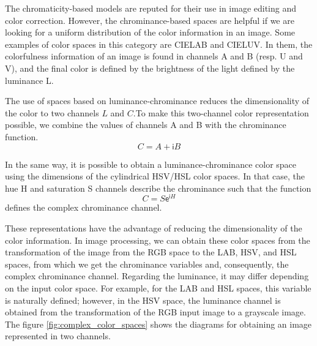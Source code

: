 The chromaticity-based models are reputed for their use in image editing and color correction. However, the chrominance-based spaces are helpful if we are looking for a uniform distribution of the color information in an image. Some examples of color spaces in this category are CIELAB and CIELUV. In them, the colorfulness information of an image is found in channels A and B (resp. U and V), and the final color is defined by the brightness of the light defined by the luminance L.

The use of spaces based on luminance-chrominance reduces the dimensionality of the color to two channels $L$ and $C$.To make this two-channel color representation possible, we combine the values of channels A and B with the chrominance function.
\begin{equation}\label{eq:chrominance_lab}
    C = A + \mathsf{i}B
\end{equation}

In the same way, it is possible to obtain a luminance-chrominance color space using the dimensions of the cylindrical HSV/HSL color spaces. In that case, the hue H and saturation S channels describe the chrominance such that the function
\begin{equation}\label{eq:chrominance_hsv}
    C = S \mathsf{e}^{\mathsf{i}H}
\end{equation}
defines the complex chrominance channel.

These representations have the advantage of reducing the dimensionality of the color information. In image processing, we can obtain these color spaces from the transformation of the image from the RGB space to the LAB, HSV, and HSL spaces, from which we get the chrominance variables and, consequently, the complex chrominance channel. Regarding the luminance, it may differ depending on the input color space. For example, for the LAB and HSL spaces, this variable is naturally defined; however, in the HSV space, the luminance channel is obtained from the transformation of the RGB input image to a grayscale image. The figure \ref{fig:complex_color_spaces} shows the diagrams for obtaining an image represented in two channels.

